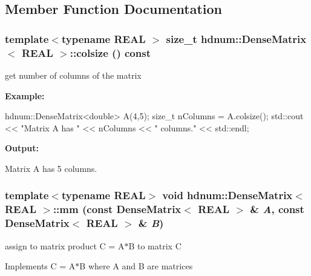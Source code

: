 \subsection{Member Function Documentation}
\hypertarget{classhdnum_1_1DenseMatrix_ac120c9c3beacb257ea9a8596079bfe4c}{
\subsubsection[{colsize}]{\setlength{\rightskip}{0pt plus 5cm}template$<$typename REAL $>$ size\_\-t {\bf hdnum::DenseMatrix}$<$ REAL $>$::colsize () const}}
\label{classhdnum_1_1DenseMatrix_ac120c9c3beacb257ea9a8596079bfe4c}


get number of columns of the matrix 

{\bfseries Example:} 
\begin{DoxyCode}
  hdnum::DenseMatrix<double> A(4,5);
  size_t nColumns = A.colsize();
  std::cout << "Matrix A has " << nColumns << " columns." << std::endl;
\end{DoxyCode}


{\bfseries Output:} \begin{DoxyVerb}
Matrix A has 5 columns.
	  \end{DoxyVerb}
 \hypertarget{classhdnum_1_1DenseMatrix_ad79f3e02f3a7a3b2639992cc717470d9}{
\subsubsection[{mm}]{\setlength{\rightskip}{0pt plus 5cm}template$<$typename REAL$>$ void {\bf hdnum::DenseMatrix}$<$ REAL $>$::mm (const {\bf DenseMatrix}$<$ REAL $>$ \& {\em A}, \/  const {\bf DenseMatrix}$<$ REAL $>$ \& {\em B})}}
\label{classhdnum_1_1DenseMatrix_ad79f3e02f3a7a3b2639992cc717470d9}


assign to matrix product C = A$\ast$B to matrix C 

Implements C = A$\ast$B where A and B are matrices


